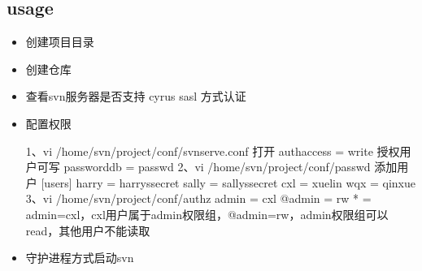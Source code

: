 \documentclass[a4paper,10pt,english]{sphinxmanual}
\begin{document}
\subsection{usage}
\label{\detokenize{versionCtrl/svn:usage}}\begin{itemize}
\item {} 
创建项目目录

\begin{sphinxVerbatim}[commandchars=\\\{\}]
 
\end{sphinxVerbatim}

\item {} 
创建仓库

\begin{sphinxVerbatim}[commandchars=\\\{\}]
  
   
\end{sphinxVerbatim}

\item {} 
查看svn服务器是否支持 cyrus sasl 方式认证

\begin{sphinxVerbatim}[commandchars=\\\{\}]
 
     
\end{sphinxVerbatim}

\item {} 
配置权限

\begin{sphinxVerbatim}[commandchars=\\\{\}]
1、vi /home/svn/project/conf/svnserve.conf
打开 auth\PYGZhy{}access = write 授权用户可写
password\PYGZhy{}db = passwd
2、vi /home/svn/project/conf/passwd
添加用户
[users]
\PYGZsh{} harry = harryssecret
\PYGZsh{} sally = sallyssecret
cxl = xuelin
wqx = qinxue
3、vi /home/svn/project/conf/authz
admin = cxl
@admin = rw
* =
admin=cxl，cxl用户属于admin权限组，@admin=rw，admin权限组可以read，其他用户不能读取
\end{sphinxVerbatim}

\item {} 
守护进程方式启动svn

\begin{sphinxVerbatim}[commandchars=\\\{\}]
   
\end{sphinxVerbatim}


\end{itemize}
\end{document}
